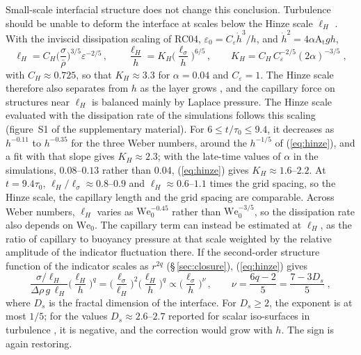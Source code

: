 \documentclass[lineno]{jfm}
\newcommand{\At}{\mathrm{A_t}}
\newcommand{\We}{\mathrm{We}_0}
\newcommand{\lls}{\ell_\sigma}
\newcommand{\hd}{\dot h}
\begin{document}
Small-scale interfacial structure does not change this conclusion. Turbulence should be unable to deform the interface at scales below the Hinze scale $\ell_H$ \citep{Kolmogorov1949,Hinze1955}. With the inviscid dissipation scaling of RC04, $\varepsilon_0 = C_\varepsilon \hd^3/h$, and $\hd^2 = 4 \alpha \At g h$,
\begin{equation}
  \ell_H = C_H \Big(\frac{\sigma}{\bar\rho}\Big)^{3/5} \varepsilon^{-2/5} \, , \qquad \frac{\ell_H}{h} = K_H \Big(\frac{\lls}{h}\Big)^{6/5} \, , \qquad K_H = C_H \, C_\varepsilon^{-2/5} (2 \alpha)^{-3/5} \;,
  \label{eq:hinze}
\end{equation}
with $C_H \approx 0.725$, so that $K_H \approx 3.3$ for $\alpha = 0.04$ and $C_\varepsilon = 1$. The Hinze scale therefore also separates from $h$ as the layer grows \citep{Chertkov2005}, and the capillary force on structures near $\ell_H$ is balanced mainly by Laplace pressure. The Hinze scale evaluated with the dissipation rate of the simulations \citep{Walker2027_2} follows this scaling (figure~S1 of the supplementary material). For $6 \le t/\tau_0 \le 9.4$, it decreases as $h^{-0.11}$ to $h^{-0.35}$ for the three Weber numbers, around the $h^{-1/5}$ of (\ref{eq:hinze}), and a fit with that slope gives $K_H \approx 2.3$; with the late-time values of $\alpha$ in the simulations, $0.08$--$0.13$ rather than $0.04$, (\ref{eq:hinze}) gives $K_H \approx 1.6$--$2.2$. At $t = 9.4 \tau_0$, $\ell_H/\lls \approx 0.8$--$0.9$ and $\ell_H \approx 0.6$--$1.1$ times the grid spacing, so the Hinze scale, the capillary length and the grid spacing are comparable. Across Weber numbers, $\ell_H$ varies as $\We^{-0.45}$ rather than $\We^{-3/5}$, so the dissipation rate also depends on $\We$. The capillary term can instead be estimated at $\ell_H$, as the ratio of capillary to buoyancy pressure at that scale weighted by the relative amplitude of the indicator fluctuation there. If the second-order structure function of the indicator scales as $r^{2 q}$ (\S\,\ref{sec:closure}), (\ref{eq:hinze}) gives
\begin{equation}
  \frac{\sigma/\ell_H}{\Delta \rho \, g \, \ell_H} \Big(\frac{\ell_H}{h}\Big)^{q} = \Big(\frac{\lls}{\ell_H}\Big)^2 \Big(\frac{\ell_H}{h}\Big)^{q} \propto \Big(\frac{\lls}{h}\Big)^{\nu} \, , \qquad \nu = \frac{6 q - 2}{5} = \frac{7 - 3 D_s}{5} \;,
  \label{eq:hinze_estimate}
\end{equation}
where $D_s$ is the fractal dimension of the interface. For $D_s \ge 2$, the exponent is at most $1/5$; for the values $D_s \approx 2.6$--$2.7$ reported for scalar iso-surfaces in turbulence \citep{Sreenivasan1991}, it is negative, and the correction would grow with $h$. The sign is again restoring.
\end{document}
